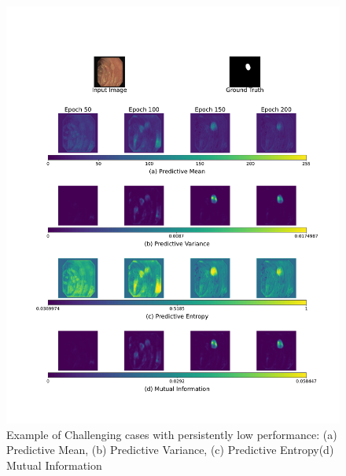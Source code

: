 \documentclass[10pt, a4paper, twocolumn]{jarticle}
\begin{document}
\begin{figure}[t] %
  \begin{center}
    \includegraphics[scale=0.25]{figure/fold2_file450_uncertainty_evolution.pdf}
    \caption{Example of Challenging cases with persistently low performance:
    (a) Predictive Mean, (b) Predictive Variance,
    (c) Predictive Entropy(d) Mutual Information}
    \label{fold2_file450}
  \end{center}
\end{figure}

\clearpage


    
\end{document}
